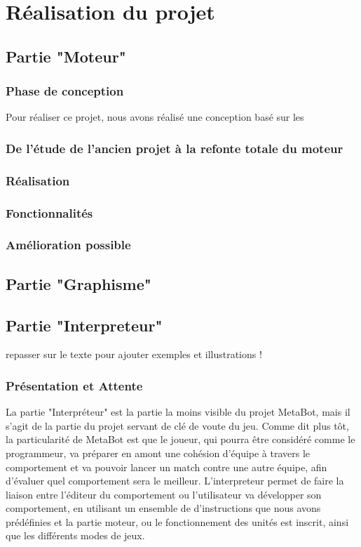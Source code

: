 \documentclass{report}
\begin{document}
\newpage
\part{Réalisation du projet}
\newpage
\chapter{Partie "Moteur"}
\section{Phase de conception}
Pour réaliser ce projet, nous avons réalisé une conception basé sur les 
\section{De l'étude de l'ancien projet à la refonte totale du moteur}
\section{Réalisation}
\section{Fonctionnalités}
\section{Amélioration possible}

\newpage
\chapter{Partie "Graphisme"}

\newpage
\chapter{Partie "Interpreteur"}
repasser sur le texte pour ajouter exemples et illustrations ! 
\section{Présentation et Attente}
La partie "Interpréteur" est la partie la moins visible du projet MetaBot,
mais il s'agit de la partie du projet servant de clé de voute du jeu.
Comme dit plus tôt, la particularité de MetaBot est que le joueur, qui pourra être considéré comme le programmeur, va préparer en amont une cohésion d'équipe à travers le comportement et va pouvoir lancer un match contre une autre équipe, afin d'évaluer quel comportement sera le meilleur.
L'interpreteur permet de faire la liaison entre l'éditeur du comportement ou l'utilisateur va développer son comportement, en utilisant un ensemble de d'instructions que nous avons prédéfinies  et la partie moteur, ou le fonctionnement des unités est inscrit, ainsi que les différents modes de jeux.
\end{document}
